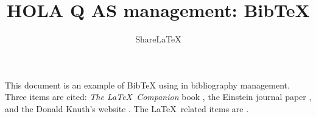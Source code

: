 \documentclass[a4paper,10pt]{article}
\title{HOLA Q AS management: BibTeX}
\author{Share\LaTeX}
\begin{document}
\maketitle

This document is an example of BibTeX using in bibliography management. Three items are cited: \textit{The \LaTeX\ Companion} book \cite{latexcompanion}, the Einstein journal paper \cite{einstein}, and the Donald Knuth's website \cite{knuthwebsite}. The \LaTeX\ related items are \cite{latexcompanion,knuthwebsite}. 

\medskip


\end{document}
